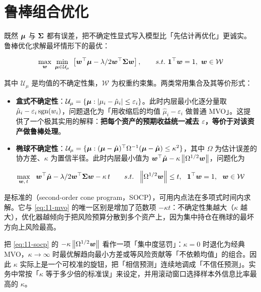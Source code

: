 \section{鲁棒组合优化}

既然 $\bm{\mu}$ 与 $\bm{\Sigma}$ 都有误差，把不确定性显式写入模型比「先估计再优化」更诚实。鲁棒优化求解最坏情形下的最优：

\begin{equation}\label{eq:11-robust}
  \max_{\wvec}\ \min_{\muvec \in \mathcal{U}_\mu}\ \left[\wvec^{\top}\muvec - \frac{\lambda}{2}\wvec^{\top}\Sigmamat\wvec\right],
  \qquad \text{s.t.}\ \mathbf{1}^{\top}\wvec = 1,\ \wvec \in \mathcal{W}
\end{equation}

其中 $\mathcal{U}_\mu$ 是均值的不确定性集，$\mathcal{W}$ 为权重约束集。两类常用集合及其等价形式：

\begin{itemize}[leftmargin=1.6em, itemsep=3pt]
  \item \textbf{盒式不确定性}：$\mathcal{U}_\mu = \{\bm{\mu}: \left\lvert \mu_i - \hat{\mu}_i \right\rvert \le \varepsilon_i\}$。此时内层最小化逐分量取 $\hat{\mu}_i - \varepsilon_i\operatorname{sgn}(w_i)$，问题退化为「用收缩后的均值 $\hat{\mu}_i - \varepsilon_i$ 做普通 MVO」。这提供了一个极其实用的解释：\textbf{把每个资产的预期收益统一减去 $\varepsilon$，等价于对该资产做鲁棒处理}。
  \item \textbf{椭球不确定性}：$\mathcal{U}_\mu = \{\bm{\mu}: (\bm{\mu} - \hat{\bm{\mu}})^{\top}\Omega^{-1}(\bm{\mu} - \hat{\bm{\mu}}) \le \kappa^{2}\}$，其中 $\Omega$ 为估计误差的协方差、$\kappa$ 为置信半径。此时内层最小值为 $\bm{w}^{\top}\hat{\bm{\mu}} - \kappa\left\lVert \Omega^{1/2}\bm{w} \right\rVert$，问题化为
\end{itemize}

\begin{equation}\label{eq:11-socp}
  \max_{\wvec,\,t}\ \ \wvec^{\top}\hat{\muvec} - \frac{\lambda}{2}\wvec^{\top}\Sigmamat\wvec - \kappa\,t
  \qquad \text{s.t.}\ \ \norm{\Omega^{1/2}\wvec} \le t,\ \ \mathbf{1}^{\top}\wvec = 1,\ \ \wvec \in \mathcal{W}
\end{equation}

 是标准的（second-order cone program，SOCP），可用内点法在多项式时间内求解。它与 \cref{eq:11-mvo} 的唯一区别是增加了范数项 $-\kappa t$：不确定性集越大（$\kappa$ 越大），优化器越倾向于把风险预算分散到多个资产上，因为集中持仓在椭球的最坏方向上风险最高。

\begin{intuitionbox}[鲁棒性就是惩罚集中度]
把 \cref{eq:11-socp} 的 $-\kappa\left\lVert \Omega^{1/2}\bm{w} \right\rVert$ 看作一项「集中度惩罚」：$\kappa = 0$ 时退化为经典 MVO，$\kappa \to \infty$ 时最优解趋向最小方差或等风险贡献等「不依赖均值」的组合。因此 $\kappa$ 实际上是一个可校准的旋钮，把「相信预测」连续地调成「不信任预测」。实务中常按「$\kappa$ 等于多少倍的标准误」来设定，并用滚动窗口选择样本外信息比率最高的 $\kappa$。
\end{intuitionbox}

